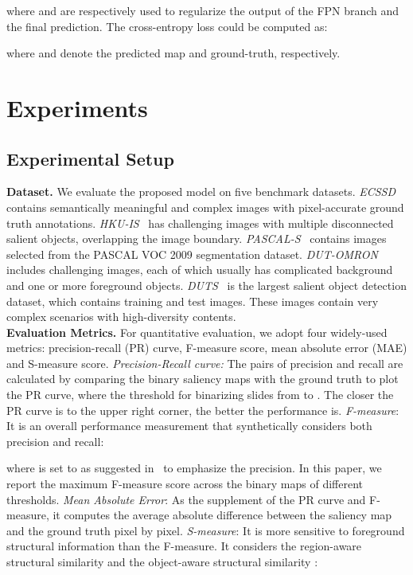 \documentclass[runningheads]{llncs}
\begin{document}
	where  and  are respectively used to regularize the output of the FPN branch and the final prediction. The cross-entropy loss could be computed as:
	
	where  and  denote the predicted map and 
	ground-truth, respectively.
	\section{Experiments}
	\subsection{Experimental Setup}
	\textbf{Dataset.} We evaluate the proposed model
	on five benchmark datasets. \emph{ECSSD}~\cite{ECSSD}  contains    semantically meaningful and complex images with pixel-accurate ground truth annotations. \emph{HKU-IS}~\cite{HKU-IS} has  challenging  images with multiple disconnected salient objects, overlapping the image boundary. \emph{PASCAL-S}~\cite{PASCAL-S} contains  images selected from the PASCAL VOC 2009 segmentation dataset. \emph{DUT-OMRON}~\cite{DUT-OMRON} includes  challenging images, each of which usually has complicated background and one or more foreground objects.
	\emph{DUTS}~\cite{DUTS} is the largest salient object detection dataset, which contains  training and  test images. These images contain very complex scenarios with high-diversity contents.
	\\
	\textbf{Evaluation Metrics.} For quantitative evaluation, we adopt four widely-used metrics: precision-recall (PR) curve, F-measure score, mean absolute error (MAE) and S-measure score. \emph{Precision-Recall curve:} The pairs of precision and recall are calculated by comparing the binary saliency maps with the ground truth to plot the PR curve, where the threshold for binarizing slides from  to . The closer the PR curve is to the upper right corner, the better the performance is.
\emph{F-measure}: It is an overall performance measurement that synthetically considers both precision and recall:
	
	where  is set to  as suggested in~\cite{colorcontrast/Fm} to emphasize the precision. In this paper, we report the maximum F-measure score across the binary maps of different thresholds.
\emph{Mean Absolute Error}: As the supplement of the PR curve and F-measure, it computes the average absolute difference between the saliency map and the ground truth pixel by pixel.
\emph{S-measure}: It is more sensitive to foreground structural information than the F-measure. It considers the region-aware structural similarity   and the object-aware structural similarity  : 
	
\end{document}
